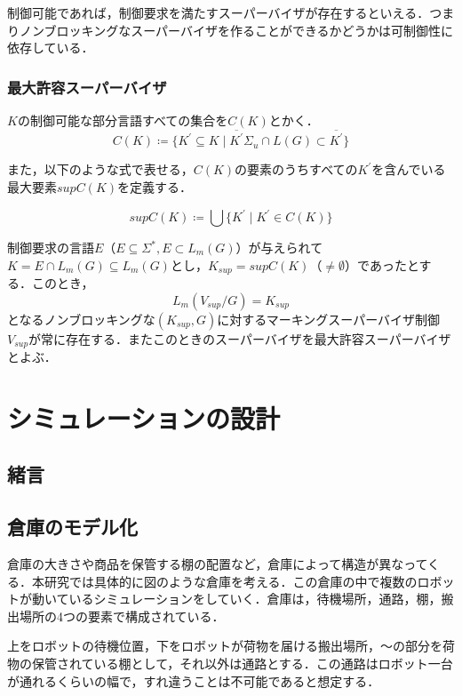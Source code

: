 \documentclass[dvipdfmx]{newthesis}
\begin{document}
制御可能であれば，制御要求を満たすスーパーバイザが存在するといえる．つまりノンブロッキングなスーパーバイザを作ることができるかどうかは可制御性に依存している．

\subsection{最大許容スーパーバイザ}
$K$の制御可能な部分言語すべての集合を$C(K)$とかく．
\begin{equation}
    C(K)\coloneqq\{K^\prime\subseteq K\mid\overline{K^\prime}\Sigma_u\cap L(G)\subset\overline{K^\prime}\}
\end{equation}

また，以下のような式で表せる，$C(K)$の要素のうちすべての$K^\prime$を含んでいる最大要素$supC(K)$を定義する．

\begin{equation}
    supC(K) \coloneqq \bigcup\{K^\prime\mid K^\prime\in C(K)\}
\end{equation}

制御要求の言語$E（E\subseteq\Sigma^\ast,E\subset L_m(G)）$が与えられて$K=E\cap L_m(G)\subseteq L_m(G)$とし，$K_{sup}=supC(K)$（$\neq\emptyset$）であったとする．このとき，
\begin{equation}
    L_m(V_{sup}/G)=K_{sup}
\end{equation}
となるノンブロッキングな$(K_{sup},G)$に対するマーキングスーパーバイザ制御$V_{sup}$が常に存在する．またこのときのスーパーバイザを最大許容スーパーバイザとよぶ．


\chapter{シミュレーションの設計}
\setcounter{section}{-1}
\section{緒言}

\section{倉庫のモデル化}

倉庫の大きさや商品を保管する棚の配置など，倉庫によって構造が異なってくる．本研究では具体的に図のような倉庫を考える．この倉庫の中で複数のロボットが動いているシミュレーションをしていく．倉庫は，待機場所，通路，棚，搬出場所の4つの要素で構成されている．

上をロボットの待機位置，下をロボットが荷物を届ける搬出場所，～の部分を荷物の保管されている棚として，それ以外は通路とする．この通路はロボット一台が通れるくらいの幅で，すれ違うことは不可能であると想定する．
\end{document}
